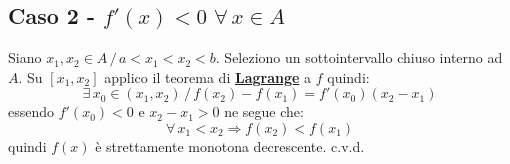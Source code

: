 \documentclass[../dimostrazioni]{subfiles}
\begin{document}
            \subsection*{Caso 2 - \( f'(x) < 0 \, \, \forall \, x \in A \)}

            Siano \(x_1, x_2 \in A \, / \, a < x_1 < x_2 < b \). Seleziono un sottointervallo chiuso interno ad \(A\).
            Su \( [x_1, x_2] \) applico il teorema di \textbf{\hyperref[teoLagrange]{Lagrange}} a \(f\) quindi:
            \[
                \exists \, x_0 \in (x_1, x_2) \, / \, f(x_2) - f(x_1) = f'(x_0)(x_2 - x_1) 
            \]
            essendo \( f'(x_0) < 0 \) e \( x_2 - x_1 > 0 \) ne segue che:
            \[
                \forall \, x_1 < x_2 \Rightarrow f(x_2) < f(x_1)
            \]
            quindi \(f(x)\) è strettamente monotona decrescente. c.v.d.
    
    
\end{document}
